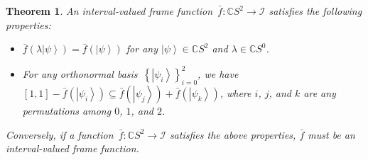 \documentclass[12pt]{iopart}
\theoremstyle{plain}
\newtheorem{thm}{Theorem}
\theoremstyle{definition}
\newcommand{\ket}[1]{{\left\vert{#1}\right\rangle}}
\begin{document}
\begin{thm}\label{thm:interval-valued-frame-function}An interval-valued
frame function~$\bar{f}:\mathbb{C}S^{2}\rightarrow\mathscr{I}$ satisfies
the following properties:
\begin{itemize}
\item $\bar{f}\left(\lambda\ket{\psi}\right)=\bar{f}\left(\ket{\psi}\right)$
for any $\ket{\psi}\in\mathbb{C}S^{2}$ and $\lambda\in\mathbb{C}S^{0}$. 
\item For any orthonormal basis~$\left\{ \ket{\psi_{i}}\right\} _{i=0}^{2}$,
we have $\left[1,1\right]-\bar{f}\left(\ket{\psi_{i}}\right)\subseteq\bar{f}\left(\ket{\psi_{j}}\right)+\bar{f}\left(\ket{\psi_{k}}\right)$,
where $i$, $j$, and $k$ are any permutations among $0$, $1$,
and $2$. 
\end{itemize}
Conversely, if a function~$\bar{f}:\mathbb{C}S^{2}\rightarrow\mathscr{I}$
satisfies the above properties, $\bar{f}$ must be an interval-valued
frame function.\end{thm}
\end{document}
